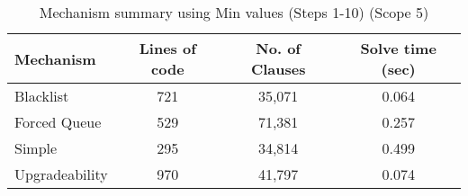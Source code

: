 \begin{table}[htbp]
\centering
\begin{tabular}{|l|c|c|c|}
\hline
\textbf{Mechanism} & \textbf{Lines of code} & \textbf{No. of Clauses} & \textbf{Solve time (sec)} \\
\hline
Blacklist & 721 & 35,071 & 0.064 \\
Forced Queue & 529 & 71,381 & 0.257 \\
Simple & 295 & 34,814 & 0.499 \\
Upgradeability & 970 & 41,797 & 0.074 \\
\hline
\end{tabular}
\caption{Mechanism summary using Min values (Steps 1-10) (Scope 5)}
\label{tab:mechanism_summary_min_steps_10}
\end{table}